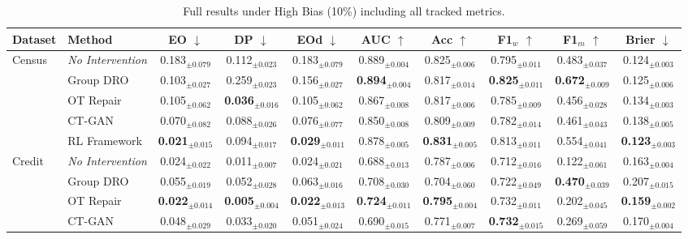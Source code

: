 \begin{table}[t]
\centering
\setlength{\tabcolsep}{5pt}
\caption{Full results under High Bias (10\%) including all tracked metrics.}
\label{tab:010_full}
\begin{tabular}{llcccccccc}
\toprule
Dataset & Method & EO $\downarrow$ & DP $\downarrow$ & EOd $\downarrow$ & AUC $\uparrow$ & Acc $\uparrow$ & F1$_w$ $\uparrow$ & F1$_m$ $\uparrow$ & Brier $\downarrow$ \\
\midrule
\multirow{5}{*}{Census} & \textit{No Intervention} & 0.183$_{\pm 0.079}$ & 0.112$_{\pm 0.023}$ & 0.183$_{\pm 0.079}$ & 0.889$_{\pm 0.004}$ & 0.825$_{\pm 0.006}$ & 0.795$_{\pm 0.011}$ & 0.483$_{\pm 0.037}$ & 0.124$_{\pm 0.003}$ \\
 & Group DRO & 0.103$_{\pm 0.027}$ & 0.259$_{\pm 0.023}$ & 0.156$_{\pm 0.027}$ & \textbf{0.894$_{\pm 0.004}$} & 0.817$_{\pm 0.014}$ & \textbf{0.825$_{\pm 0.011}$} & \textbf{0.672$_{\pm 0.009}$} & 0.125$_{\pm 0.006}$ \\
 & OT Repair & 0.105$_{\pm 0.062}$ & \textbf{0.036$_{\pm 0.016}$} & 0.105$_{\pm 0.062}$ & 0.867$_{\pm 0.008}$ & 0.817$_{\pm 0.006}$ & 0.785$_{\pm 0.009}$ & 0.456$_{\pm 0.028}$ & 0.134$_{\pm 0.003}$ \\
 & CT-GAN & 0.070$_{\pm 0.082}$ & 0.088$_{\pm 0.026}$ & 0.076$_{\pm 0.077}$ & 0.850$_{\pm 0.008}$ & 0.809$_{\pm 0.009}$ & 0.782$_{\pm 0.014}$ & 0.461$_{\pm 0.043}$ & 0.138$_{\pm 0.005}$ \\
 & RL Framework & \textbf{0.021$_{\pm 0.015}$} & 0.094$_{\pm 0.017}$ & \textbf{0.029$_{\pm 0.011}$} & 0.878$_{\pm 0.005}$ & \textbf{0.831$_{\pm 0.005}$} & 0.813$_{\pm 0.011}$ & 0.554$_{\pm 0.041}$ & \textbf{0.123$_{\pm 0.003}$} \\
\midrule
\multirow{5}{*}{Credit} & \textit{No Intervention} & 0.024$_{\pm 0.022}$ & 0.011$_{\pm 0.007}$ & 0.024$_{\pm 0.021}$ & 0.688$_{\pm 0.013}$ & 0.787$_{\pm 0.006}$ & 0.712$_{\pm 0.016}$ & 0.122$_{\pm 0.061}$ & 0.163$_{\pm 0.004}$ \\
 & Group DRO & 0.055$_{\pm 0.019}$ & 0.052$_{\pm 0.028}$ & 0.063$_{\pm 0.016}$ & 0.708$_{\pm 0.030}$ & 0.704$_{\pm 0.060}$ & 0.722$_{\pm 0.049}$ & \textbf{0.470$_{\pm 0.039}$} & 0.207$_{\pm 0.015}$ \\
 & OT Repair & \textbf{0.022$_{\pm 0.014}$} & \textbf{0.005$_{\pm 0.004}$} & \textbf{0.022$_{\pm 0.013}$} & \textbf{0.724$_{\pm 0.011}$} & \textbf{0.795$_{\pm 0.004}$} & 0.732$_{\pm 0.011}$ & 0.202$_{\pm 0.045}$ & \textbf{0.159$_{\pm 0.002}$} \\
 & CT-GAN & 0.048$_{\pm 0.029}$ & 0.033$_{\pm 0.020}$ & 0.051$_{\pm 0.024}$ & 0.690$_{\pm 0.015}$ & 0.771$_{\pm 0.007}$ & \textbf{0.732$_{\pm 0.015}$} & 0.269$_{\pm 0.059}$ & 0.170$_{\pm 0.004}$ \\

\end{tabular}
\end{table}
